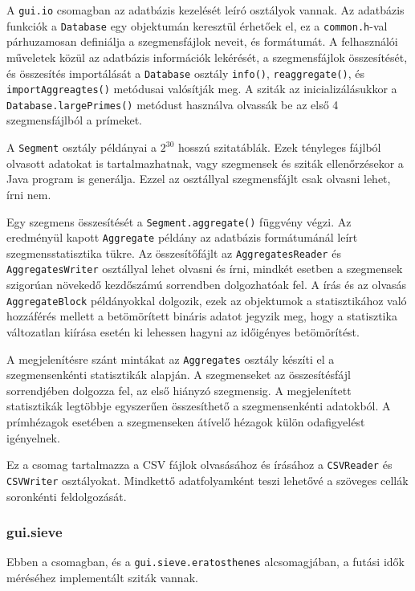 A \texttt{gui.io} csomagban az adatbázis kezelését leíró osztályok vannak.
Az adatbázis funkciók a \texttt{Database} egy objektumán keresztül érhetőek el, ez a \texttt{common.h}-val párhuzamosan definiálja a szegmensfájlok neveit, és formátumát.
A felhasználói műveletek közül az adatbázis információk lekérését, a szegmensfájlok összesítését, és összesítés importálását a \texttt{Database} osztály \texttt{info()}, \texttt{reaggregate()}, és \texttt{importAggreagtes()} metódusai valósítják meg.
A sziták az inicializálásukkor a \texttt{Database.largePrimes()} metódust használva olvassák be az első 4 szegmensfájlból a prímeket.

A \texttt{Segment} osztály példányai a $2^{30}$ hosszú szitatáblák.
Ezek tényleges fájlból olvasott adatokat is tartalmazhatnak, vagy szegmensek és sziták ellenőrzésekor a Java program is generálja.
Ezzel az osztállyal szegmensfájlt csak olvasni lehet, írni nem.

Egy szegmens összesítését a \texttt{Segment.aggregate()} függvény végzi.
Az eredményül kapott \texttt{Aggregate} példány az adatbázis formátumánál leírt szegmensstatisztika tükre.
Az összesítőfájlt az \texttt{AggregatesReader} és \texttt{AggregatesWriter} osztállyal lehet olvasni és írni, mindkét esetben a szegmensek szigorúan növekedő kezdőszámú sorrendben dolgozhatóak fel.
A írás és az olvasás \texttt{AggregateBlock} példányokkal dolgozik, ezek az objektumok a statisztikához való hozzáférés mellett a betömörített bináris adatot jegyzik meg, hogy a statisztika változatlan kiírása esetén ki lehessen hagyni az időigényes betömörítést.

A megjelenítésre szánt mintákat az \texttt{Aggregates} osztály készíti el a szegmensenkénti statisztikák alapján.
A szegmenseket az összesítésfájl sorrendjében dolgozza fel, az első hiányzó szegmensig.
A megjelenített statisztikák legtöbbje egyszerűen összesíthető a szegmensenkénti adatokból.
A prímhézagok esetében a szegmenseken átívelő hézagok külön odafigyelést igényelnek.

Ez a csomag tartalmazza a CSV fájlok olvasásához és írásához a \texttt{CSVReader} és \texttt{CSVWriter} osztályokat.
Mindkettő adatfolyamként teszi lehetővé a szöveges cellák soronkénti feldolgozását.

\subsubsection{gui.sieve}

Ebben a csomagban, és a \texttt{gui.sieve.eratosthenes} alcsomagjában, a futási idők méréséhez implementált sziták vannak.

